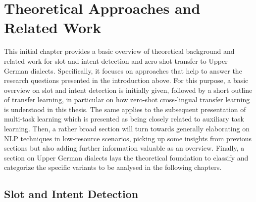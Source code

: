 \documentclass[11pt,a4paper,twoside,openright]{scrbook}
\begin{document}
\chapter{Theoretical Approaches and Related Work}

This initial chapter provides a basic overview of theoretical background and related work for slot and intent detection and zero-shot transfer to Upper German dialects. Specifically, it focuses on approaches that help to answer the research questions presented in the introduction above. For this purpose, a basic overview on slot and intent detection is initially given, followed by a short outline of transfer learning, in particular on how zero-shot cross-lingual transfer learning is understood in this thesis. The same applies to the subsequent presentation of multi-task learning which is presented as being closely related to auxiliary task learning. Then, a rather broad section will turn towards generally elaborating on NLP techniques in low-resource scenarios, picking up some insights from previous sections but also adding further information valuable as an overview. Finally, a section on Upper German dialects lays the theoretical foundation to classify and categorize the specific variants to be analysed in the following chapters.





\section{Slot and Intent Detection}
\end{document}
